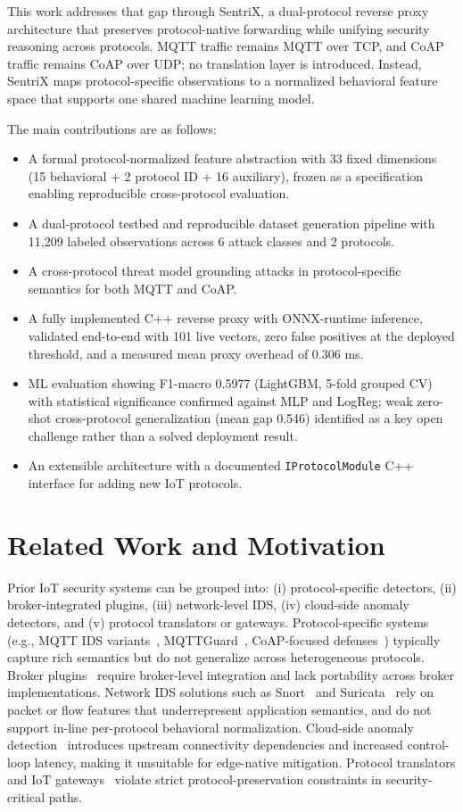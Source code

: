\documentclass[conference]{IEEEtran}
\begin{document}
This work addresses that gap through SentriX, a dual-protocol reverse proxy architecture that preserves protocol-native forwarding while unifying security reasoning across protocols. MQTT traffic remains MQTT over TCP, and CoAP traffic remains CoAP over UDP; no translation layer is introduced. Instead, SentriX maps protocol-specific observations to a normalized behavioral feature space that supports one shared machine learning model.

The main contributions are as follows:
\begin{itemize}
\item A formal protocol-normalized feature abstraction with 33 fixed dimensions (15 behavioral + 2 protocol ID + 16 auxiliary), frozen as a specification enabling reproducible cross-protocol evaluation.
\item A dual-protocol testbed and reproducible dataset generation pipeline with 11,209 labeled observations across 6 attack classes and 2 protocols.
\item A cross-protocol threat model grounding attacks in protocol-specific semantics for both MQTT and CoAP.
\item A fully implemented C++ reverse proxy with ONNX-runtime inference, validated end-to-end with 101 live vectors, zero false positives at the deployed threshold, and a measured mean proxy overhead of 0.306 ms.
\item ML evaluation showing F1-macro 0.5977 (LightGBM, 5-fold grouped CV) with statistical significance confirmed against MLP and LogReg; weak zero-shot cross-protocol generalization (mean gap 0.546) identified as a key open challenge rather than a solved deployment result.
\item An extensible architecture with a documented \texttt{IProtocolModule} C++ interface for adding new IoT protocols.
\end{itemize}

\section{Related Work and Motivation}
Prior IoT security systems can be grouped into: (i) protocol-specific detectors, (ii) broker-integrated plugins, (iii) network-level IDS, (iv) cloud-side anomaly detectors, and (v) protocol translators or gateways. Protocol-specific systems (e.g., MQTT IDS variants~\cite{mqtt_ml_ids}, MQTTGuard~\cite{mqttguard}, CoAP-focused defenses~\cite{coap_ids}) typically capture rich semantics but do not generalize across heterogeneous protocols. Broker plugins~\cite{broker_plugin} require broker-level integration and lack portability across broker implementations. Network IDS solutions such as Snort~\cite{snort} and Suricata~\cite{suricata} rely on packet or flow features that underrepresent application semantics, and do not support in-line per-protocol behavioral normalization. Cloud-side anomaly detection~\cite{cloud_iot_ml} introduces upstream connectivity dependencies and increased control-loop latency, making it unsuitable for edge-native mitigation. Protocol translators and IoT gateways~\cite{iot_gateway} violate strict protocol-preservation constraints in security-critical paths.
\end{document}
